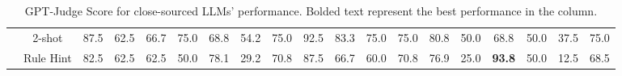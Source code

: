 \documentclass[letterpaper]{article} %
\begin{document}
\begin{table*}[t]
{\begin{tabular}{lcccccccccccccccccc}
 & \cellcolor{darkpurple!25}2-shot & \cellcolor{lightpurple!25}87.5 & \cellcolor{lightpurple!25}62.5 & \cellcolor{lightpurple!25}66.7 & \cellcolor{lightpurple!25}75.0 & \cellcolor{lightpurple!25}68.8 & \cellcolor{lightpurple!25}54.2 & \cellcolor{lightpurple!25}75.0 & \cellcolor{lightpurple!25}92.5 & \cellcolor{lightpurple!25}83.3 & \cellcolor{lightpurple!25}75.0 & \cellcolor{lightpurple!25}75.0 & \cellcolor{lightpurple!25}80.8 & \cellcolor{lightpurple!25}50.0 & \cellcolor{lightpurple!25}68.8 & \cellcolor{lightpurple!25}50.0 & \cellcolor{lightpurple!25}37.5 & \cellcolor{darkpurple!25}75.0 \\
 & \cellcolor{darkpurple!25}Rule Hint & \cellcolor{lightpurple!25}82.5 & \cellcolor{lightpurple!25}62.5 & \cellcolor{lightpurple!25}62.5 & \cellcolor{lightpurple!25}50.0 & \cellcolor{lightpurple!25}78.1 & \cellcolor{lightpurple!25}29.2 & \cellcolor{lightpurple!25}70.8 & \cellcolor{lightpurple!25}87.5 & \cellcolor{lightpurple!25}66.7 & \cellcolor{lightpurple!25}60.0 & \cellcolor{lightpurple!25}70.8 & \cellcolor{lightpurple!25}76.9 & \cellcolor{lightpurple!25}25.0 & \cellcolor{lightpurple!25}\textbf{93.8} & \cellcolor{lightpurple!25}50.0 & \cellcolor{lightpurple!25}12.5 & \cellcolor{darkpurple!25}68.5 \\
\bottomrule
\end{tabular}}
\caption{GPT-Judge Score for close-sourced LLMs' performance. Bolded text represent the best performance in the column.}
\label{tab:api_overall}
\end{table*}
\end{document}
